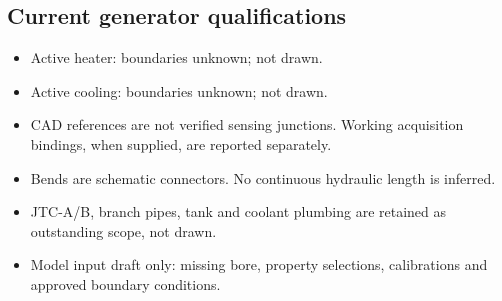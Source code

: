 \documentclass[11pt]{article}
\begin{document}
\subsection*{Current generator qualifications}
\begin{itemize}
\item Active heater: boundaries unknown; not drawn.
\item Active cooling: boundaries unknown; not drawn.
\item CAD references are not verified sensing junctions. Working acquisition bindings, when supplied, are reported separately.
\item Bends are schematic connectors. No continuous hydraulic length is inferred.
\item JTC-A/B, branch pipes, tank and coolant plumbing are retained as outstanding scope, not drawn.
\item Model input draft only: missing bore, property selections, calibrations and approved boundary conditions.
\end{itemize}
\clearpage
\end{document}
